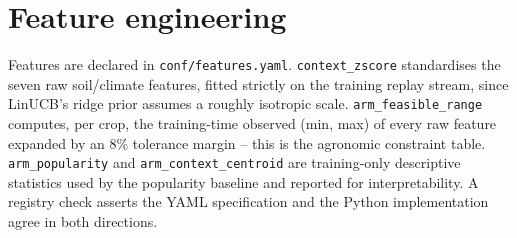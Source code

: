 \section{Feature engineering}
Features are declared in \texttt{conf/features.yaml}.
\texttt{context\_zscore} standardises the seven raw soil/climate features,
fitted strictly on the training replay stream, since LinUCB's ridge prior
assumes a roughly isotropic scale. \texttt{arm\_feasible\_range} computes,
per crop, the training-time observed (min, max) of every raw feature
expanded by an 8\% tolerance margin -- this is the agronomic constraint
table. \texttt{arm\_popularity} and \texttt{arm\_context\_centroid} are
training-only descriptive statistics used by the popularity baseline and
reported for interpretability. A registry check asserts the YAML
specification and the Python implementation agree in both directions.
